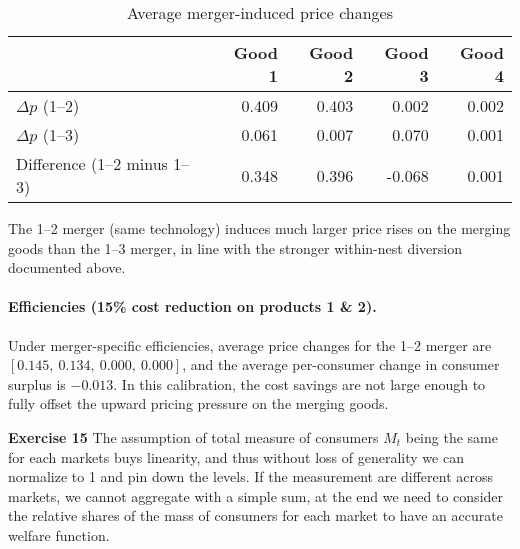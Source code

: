 \documentclass[11pt]{article}
\begin{document}
	\begin{table}[h!]
		\centering
		\caption{Average merger-induced price changes}
		\label{tab:mergerdeltas}
		\begin{tabular}{lrrrr}
			\toprule
			& Good 1 & Good 2 & Good 3 & Good 4 \\
			\midrule
			$\Delta p$ (1--2)           & 0.409 & 0.403 & 0.002 & 0.002 \\
			$\Delta p$ (1--3)           & 0.061 & 0.007 & 0.070 & 0.001 \\
			Difference (1--2 minus 1--3)& 0.348 & 0.396 & -0.068 & 0.001 \\
			\bottomrule
		\end{tabular}
	\end{table}
	
	\noindent
	The 1--2 merger (same technology) induces much larger price rises on the merging goods than
	the 1--3 merger, in line with the stronger within-nest diversion documented above.
	
	\paragraph{Efficiencies (15\% cost reduction on products 1 \& 2).}
	Under merger-specific efficiencies, average price changes for the 1--2 merger are
	$[0.145,\ 0.134,\ 0.000,\ 0.000]$, and the average per-consumer change in consumer surplus is $-0.013$.
	In this calibration, the cost savings are not large enough to fully offset the upward pricing pressure on the merging goods.
	
	\textbf{Exercise 15} The assumption of total measure of consumers $M_t$ being the same for each markets buys linearity, and thus without loss of generality we can normalize to 1 and pin down the levels. If the measurement are different across markets, we cannot aggregate with a simple sum, at the end we need to consider the relative shares of the mass of consumers for each market to have an accurate welfare function.
	
	
\end{document}
